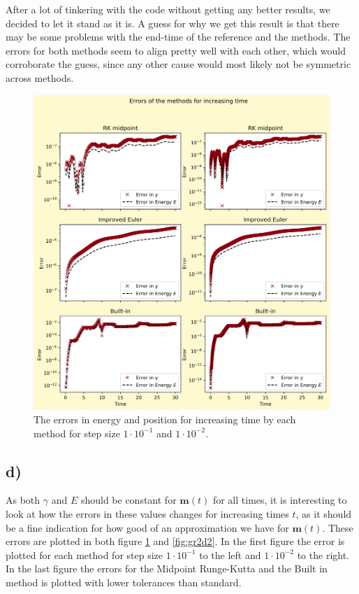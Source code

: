 \documentclass[12pt, a4paper,usenames,dvipsnames]{article}
\renewcommand\vec{\mathbf}
\begin{document}
After a lot of tinkering with the code without getting any better results, we decided to let it stand as it is. A guess for why we get this result is that there may be some problems with the end-time of the reference and the methods. The errors for both methods seem to align pretty well with each other, which would corroborate the guess, since any other cause would most likely not be symmetric across methods.


\thispagestyle{plain}
\begin{figure}[h!]
    \centering
    \includegraphics[width=\linewidth]{Graphs2d.png}
    \caption{The errors in energy and position for increasing time by each method for step size \(1\cdot10^{-1}\) and \(1\cdot10^{-2}\).}
    \label{fig:gr2d}
\end{figure}
\restoregeometry
\subsection*{d)}
As both \(\gamma\) and \(E\) should be constant for \(\vec{m}(t)\) for all times, it is interesting to look at how the errors in these values changes for increasing times \(t\), as it should be a fine indication for how good of an approximation we have for \(\vec{m}(t)\). These errors are plotted in both figure \ref{fig:gr2d} and \ref{fig:gr2d2}. In the first figure the error is plotted for each method for step size \(1\cdot10^{-1}\) to the left and \(1\cdot10^{-2}\) to the right. In the last figure the errors for the Midpoint Runge-Kutta and the Built in method is plotted with lower tolerances than standard. 
\end{document}
